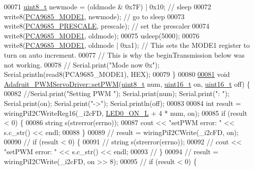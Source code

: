 \begin{DoxyCode}
00071     \hyperlink{Adafruit__PWMServoDriver_8h_ab077fa1127453be2bd9d4c3c8a768fa7}{uint8\_t} newmode = (oldmode & 0x7F) | 0x10; \textcolor{comment}{// sleep}
00072     write8(\hyperlink{Adafruit__PWMServoDriver_8h_aec642e3f25e7f83072d68acb14ae4e74}{PCA9685\_MODE1}, newmode); \textcolor{comment}{// go to sleep}
00073     write8(\hyperlink{Adafruit__PWMServoDriver_8h_a7175106bbec978d9acc85dc7485235a3}{PCA9685\_PRESCALE}, prescale); \textcolor{comment}{// set the prescaler}
00074     write8(\hyperlink{Adafruit__PWMServoDriver_8h_aec642e3f25e7f83072d68acb14ae4e74}{PCA9685\_MODE1}, oldmode);
00075     usleep(5000);
00076     write8(\hyperlink{Adafruit__PWMServoDriver_8h_aec642e3f25e7f83072d68acb14ae4e74}{PCA9685\_MODE1}, oldmode | 0xa1); \textcolor{comment}{//  This sets the MODE1 register to turn on auto
       increment.}
00077     \textcolor{comment}{// This is why the beginTransmission below was not working.}
00078     \textcolor{comment}{//  Serial.print("Mode now 0x"); Serial.println(read8(PCA9685\_MODE1), HEX);}
00079 \}
00080 
\hypertarget{Adafruit__PWMServoDriver_8cpp_source_l00081}{}\hyperlink{classAdafruit__PWMServoDriver_a724a7fc39c6fba34478ecc0eea038bd3}{00081} \textcolor{keywordtype}{void} \hyperlink{classAdafruit__PWMServoDriver_a724a7fc39c6fba34478ecc0eea038bd3}{Adafruit\_PWMServoDriver::setPWM}(\hyperlink{Adafruit__PWMServoDriver_8h_ab077fa1127453be2bd9d4c3c8a768fa7}{uint8\_t} num, 
      \hyperlink{Adafruit__PWMServoDriver_8h_a395b3b2bf5cb4674ab41b6bda68c15bb}{uint16\_t} on, \hyperlink{Adafruit__PWMServoDriver_8h_a395b3b2bf5cb4674ab41b6bda68c15bb}{uint16\_t} off) \{
00082     \textcolor{comment}{//Serial.print("Setting PWM "); Serial.print(num); Serial.print(": "); Serial.print(on);
       Serial.print("->"); Serial.println(off);}
00083 
00084     \textcolor{keywordtype}{int} result = wiringPiI2CWriteReg16(\_i2cFD, \hyperlink{Adafruit__PWMServoDriver_8h_a62f7dbcbb1fcf1084804f19a5b42248f}{LED0\_ON\_L} + 4 * num, on);
00085     \textcolor{keywordflow}{if} (result < 0) \{
00086         \textcolor{keywordtype}{string} s(strerror(errno));
00087         cout << \textcolor{stringliteral}{"setPWM error: "} << s.c\_str() << endl;
00088     \}
00089 \textcolor{comment}{//    result = wiringPiI2CWrite(\_i2cFD, on);}
00090 \textcolor{comment}{//    if (result < 0) \{}
00091 \textcolor{comment}{//        string s(strerror(errno));}
00092 \textcolor{comment}{//        cout << "setPWM error: " << s.c\_str() << endl;}
00093 \textcolor{comment}{//    \}}
00094 \textcolor{comment}{//    result = wiringPiI2CWrite(\_i2cFD, on >> 8);}
00095 \textcolor{comment}{//    if (result < 0) \{}

\end{DoxyCode}
